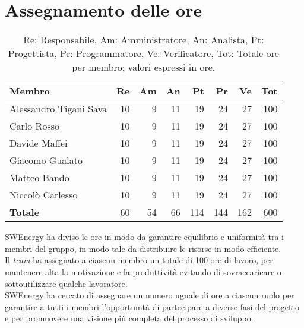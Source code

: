 \section{Assegnamento delle ore}

\begin{table}[H]
	\renewcommand{\arraystretch}{1.5}
	\centering
	\begin{tabular}{l|r|r|r|r|r|r|r}
		\textbf{Membro} & \textbf{Re} & \textbf{Am} & \textbf{An} & \textbf{Pt}
		& \textbf{Pr} & \textbf{Ve} & \textbf{Tot} \\
		\hline
		Alessandro Tigani Sava 	&	10 &  9 & 11 & 19 &  24 &  27 &  100 \\
		Carlo Rosso 			&	10 &  9 & 11 & 19 &  24 &  27 &  100 \\
		Davide Maffei			&	10 &  9 & 11 & 19 &  24 &  27 &  100 \\
		Giacomo Gualato 		&	10 &  9 & 11 & 19 &  24 &  27 &  100 \\
		Matteo Bando 			&	10 &  9 & 11 & 19 &  24 &  27 &  100 \\
		Niccolò Carlesso 		&	10 &  9 & 11 & 19 &  24 &  27 &  100 \\
		\hline
		\textbf{Totale} 		&	60 & 54 & 66 & 114 & 144 & 162 & 600 \\
	\end{tabular}

	\caption{Re: Responsabile, Am: Amministratore, An: Analista, Pt:
	Progettista, Pr: Programmatore, Ve: Verificatore, Tot: Totale ore per 
	membro; valori espressi in ore.}
\end{table}

SWEnergy ha diviso le ore in modo da garantire equilibrio e uniformità tra i
membri del gruppo, in modo tale da distribuire le risorse in modo efficiente. \\
Il \textit{team} ha assegnato a ciascun membro un totale di 100 ore di lavoro,
per mantenere alta la motivazione e la produttività evitando di sovraccaricare o
sottoutilizzare qualche lavoratore. \\
SWEnergy ha cercato di assegnare un numero uguale di ore a ciascun ruolo per
garantire a tutti i membri l'opportunità di partecipare a diverse fasi del
progetto e per promuovere una visione più completa del processo di sviluppo.
